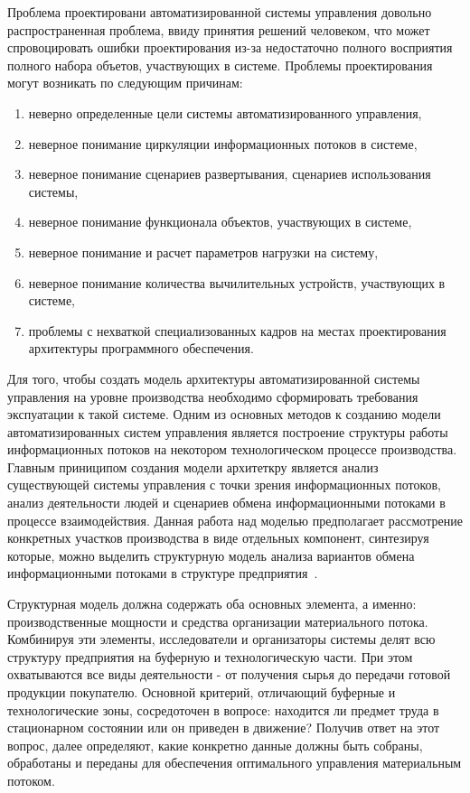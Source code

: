 Проблема проектировани автоматизированной системы управления довольно распространенная проблема, ввиду принятия решений человеком, что может спровоцировать ошибки проектирования из-за недостаточно полного восприятия полного набора объетов, участвующих в системе.
Проблемы проектирования могут возникать по следующим причинам:
\begin{enumerate}
    \item неверно определенные цели системы автоматизированного управления,
    \item неверное понимание циркуляции информационных потоков в системе,
    \item неверное понимание сценариев развертывания, сценариев использования системы,
    \item неверное понимание функционала объектов, участвующих в системе,
    \item неверное понимание и расчет параметров нагрузки на систему,
    \item неверное понимание количества вычилительных устройств, участвующих в системе,
    \item проблемы с нехваткой специализованных кадров на местах проектирования архитектуры программного обеспечения.
\end{enumerate}

Для того, чтобы создать модель архитектуры автоматизированной системы управления на уровне производства необходимо сформировать требования экспуатации к такой системе. Одним из основных методов к созданию модели автоматизированных систем управления является построение структуры работы информационных потоков на некотором технологическом процессе производства. Главным приниципом создания модели архитеткру является анализ существующей системы управления с точки зрения информационных потоков, анализ деятельности людей и сценариев обмена информационными потоками в процессе взаимодействия. Данная работа над моделью предполагает рассмотрение конкретных участков производства в виде отдельных компонент, синтезируя которые, можно выделить структурную модель анализа вариантов обмена информационными потоками в структуре предприятия~\cite{Ref13, Ref14, Ref15, Ref16,Ref17,Ref18,Ref19, Ref20, Ref21, Ref22,Ref23,Ref24}.

Структурная модель должна содержать оба основных элемента, а именно: производственные мощности и средства организации материального потока. Комбинируя эти элементы, исследователи и организаторы системы делят всю структуру предприятия на буферную и технологическую части. При этом охватываются все виды деятельности - от получения сырья до передачи готовой продукции покупателю. Основной критерий, отличающий буферные и технологические зоны, сосредоточен в вопросе: находится ли предмет труда в стационарном состоянии или он приведен в движение? Получив ответ на этот вопрос, далее определяют, какие конкретно данные должны быть собраны, обработаны и переданы для обеспечения оптимального управления материальным потоком.

